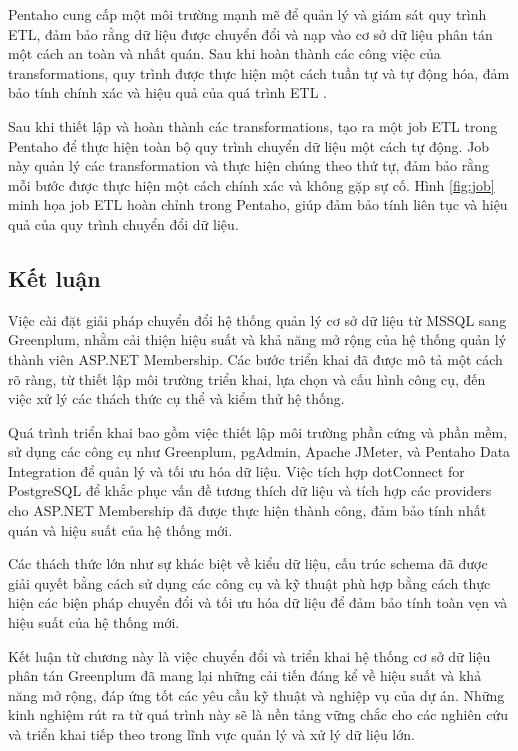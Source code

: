 \documentclass[14pt]{article}
\begin{document}
Pentaho cung cấp một môi trường mạnh mẽ để quản lý và giám sát quy trình ETL, đảm bảo rằng dữ liệu được chuyển đổi và nạp vào cơ sở dữ liệu phân tán một cách an toàn và nhất quán. Sau khi hoàn thành các công việc của transformations, quy trình được thực hiện một cách tuần tự và tự động hóa, đảm bảo tính chính xác và hiệu quả của quá trình ETL .


Sau khi thiết lập và hoàn thành các transformations, 
 tạo ra một job ETL trong Pentaho để thực hiện toàn bộ quy trình chuyển dữ liệu một cách tự động. Job này quản lý các transformation và thực hiện chúng theo thứ tự, đảm bảo rằng mỗi bước được thực hiện một cách chính xác và không gặp sự cố. Hình \ref{fig:job} minh họa job ETL hoàn chỉnh trong Pentaho, giúp đảm bảo tính liên tục và hiệu quả của quy trình chuyển đổi dữ liệu.





\subsection{Kết luận}

Việc cài đặt giải pháp chuyển đổi hệ thống quản lý cơ sở dữ liệu từ MSSQL sang Greenplum, nhằm cải thiện hiệu suất và khả năng mở rộng của hệ thống quản lý thành viên ASP.NET Membership. Các bước triển khai đã được mô tả một cách rõ ràng, từ thiết lập môi trường triển khai, lựa chọn và cấu hình công cụ, đến việc xử lý các thách thức cụ thể và kiểm thử hệ thống.

Quá trình triển khai bao gồm việc thiết lập môi trường phần cứng và phần mềm, sử dụng các công cụ như Greenplum, pgAdmin, Apache JMeter, và Pentaho Data Integration để quản lý và tối ưu hóa dữ liệu. Việc tích hợp dotConnect for PostgreSQL để khắc phục vấn đề tương thích dữ liệu và tích hợp các providers cho ASP.NET Membership đã được thực hiện thành công, đảm bảo tính nhất quán và hiệu suất của hệ thống mới.

Các thách thức lớn như sự khác biệt về kiểu dữ liệu, cấu trúc schema đã được giải quyết bằng cách sử dụng các công cụ và kỹ thuật phù hợp bằng cách thực hiện các biện pháp chuyển đổi và tối ưu hóa dữ liệu để đảm bảo tính toàn vẹn và hiệu suất của hệ thống mới.

Kết luận từ chương này là việc chuyển đổi và triển khai hệ thống cơ sở dữ liệu phân tán Greenplum đã mang lại những cải tiến đáng kể về hiệu suất và khả năng mở rộng, đáp ứng tốt các yêu cầu kỹ thuật và nghiệp vụ của dự án. Những kinh nghiệm rút ra từ quá trình này sẽ là nền tảng vững chắc cho các nghiên cứu và triển khai tiếp theo trong lĩnh vực quản lý và xử lý dữ liệu lớn.
\end{document}
